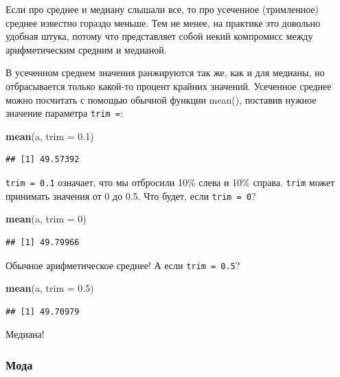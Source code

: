 \documentclass[]{book}
\newenvironment{Shaded}{\begin{snugshade}}{\end{snugshade}}
\newcommand{\KeywordTok}[1]{\textcolor[rgb]{0.13,0.29,0.53}{\textbf{#1}}}
\newcommand{\DataTypeTok}[1]{\textcolor[rgb]{0.13,0.29,0.53}{#1}}
\newcommand{\DecValTok}[1]{\textcolor[rgb]{0.00,0.00,0.81}{#1}}
\newcommand{\FloatTok}[1]{\textcolor[rgb]{0.00,0.00,0.81}{#1}}
\newcommand{\NormalTok}[1]{#1}
\begin{document}
Если про среднее и медиану слышали все, то про усеченное (тримленное)
среднее известно гораздо меньше. Тем не менее, на практике это довольно
удобная штука, потому что представляет собой некий компромисс между
арифметическим средним и медианой.

В усеченном среднем значения ранжируются так же, как и для медианы, но
отбрасывается только какой-то процент крайних значений. Усеченное
среднее можно посчитать с помощью обычной функции mean(), поставив
нужное значение параметра \texttt{trim\ =}:

\begin{Shaded}
\begin{Highlighting}[]
\KeywordTok{mean}\NormalTok{(a, }\DataTypeTok{trim =} \FloatTok{0.1}\NormalTok{)}
\end{Highlighting}
\end{Shaded}

\begin{verbatim}
## [1] 49.57392
\end{verbatim}

\texttt{trim\ =\ 0.1} означает, что мы отбросили 10\% слева и 10\%
справа. \texttt{trim} может принимать значения от 0 до 0.5. Что будет,
если \texttt{trim\ =\ 0}?

\begin{Shaded}
\begin{Highlighting}[]
\KeywordTok{mean}\NormalTok{(a, }\DataTypeTok{trim =} \DecValTok{0}\NormalTok{)}
\end{Highlighting}
\end{Shaded}

\begin{verbatim}
## [1] 49.79966
\end{verbatim}

Обычное арифметическое среднее! А если \texttt{trim\ =\ 0.5}?

\begin{Shaded}
\begin{Highlighting}[]
\KeywordTok{mean}\NormalTok{(a, }\DataTypeTok{trim =} \FloatTok{0.5}\NormalTok{)}
\end{Highlighting}
\end{Shaded}

\begin{verbatim}
## [1] 49.70979
\end{verbatim}

Медиана!

\subsubsection{Мода}\label{mode}
\end{document}

